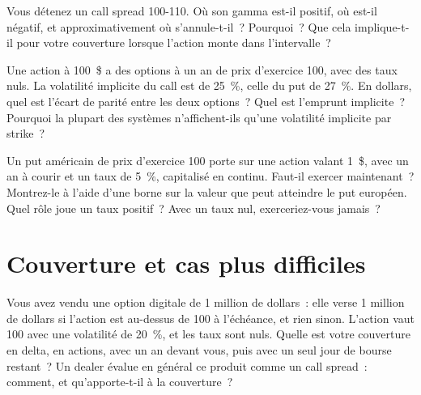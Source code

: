 \begin{question}\label{iq:iv2:options-parity-and-greeks:32}
Vous détenez un call spread 100-110. Où son gamma est-il positif, où est-il négatif, et approximativement où s'annule-t-il~? Pourquoi~? Que cela implique-t-il pour votre couverture lorsque l'action monte dans l'intervalle~?
\end{question}

\begin{question}\label{iq:iv2:options-parity-and-greeks:33}
Une action à 100~\$ a des options à un an de prix d'exercice 100, avec des taux nuls. La volatilité implicite du call est de 25~\%, celle du put de 27~\%. En dollars, quel est l'écart de parité entre les deux options~? Quel est l'emprunt implicite~? Pourquoi la plupart des systèmes n'affichent-ils qu'une volatilité implicite par strike~?
\end{question}

\begin{question}\label{iq:iv2:options-parity-and-greeks:34}
Un put américain de prix d'exercice 100 porte sur une action valant 1~\$, avec un an à courir et un taux de 5~\%, capitalisé en continu. Faut-il exercer maintenant~? Montrez-le à l'aide d'une borne sur la valeur que peut atteindre le put européen. Quel rôle joue un taux positif~? Avec un taux nul, exerceriez-vous jamais~?
\end{question}

\section{Couverture et cas plus difficiles}

\begin{question}\label{iq:iv2:options-parity-and-greeks:35}
Vous avez vendu une option digitale de 1 million de dollars~: elle verse 1 million de dollars si l'action est au-dessus de 100 à l'échéance, et rien sinon. L'action vaut 100 avec une volatilité de 20~\%, et les taux sont nuls. Quelle est votre couverture en delta, en actions, avec un an devant vous, puis avec un seul jour de bourse restant~? Un dealer évalue en général ce produit comme un call spread~: comment, et qu'apporte-t-il à la couverture~?
\end{question}

